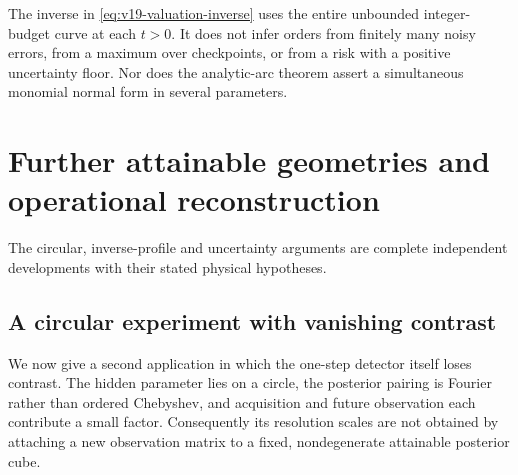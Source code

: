 \documentclass[11pt]{amsart}
\theoremstyle{definition}\newtheorem{definition}[theorem]{Definition}
\theoremstyle{remark}\newtheorem{remark}[theorem]{Remark}
\begin{document}
The inverse in \eqref{eq:v19-valuation-inverse} uses the entire
unbounded integer-budget curve at each $t>0$. It does not infer
orders from finitely many noisy errors, from a maximum over
checkpoints, or from a risk with a positive uncertainty floor.
Nor does the analytic-arc theorem assert a simultaneous monomial
normal form in several parameters.

\endgroup
\section{Further attainable geometries and operational reconstruction}
\label{app:additional-geometry}
The circular, inverse-profile and uncertainty arguments are complete
independent developments with their stated physical hypotheses.
\begingroup
\let\section\subsection
\let\subsection\subsubsection
\let\subsubsection\paragraph
\section{A circular experiment with vanishing contrast}
\label{sec:circular}
We now give a second application in which the one-step detector itself
loses contrast. The hidden parameter lies on a circle, the posterior
pairing is Fourier rather than ordered Chebyshev, and acquisition and
future observation each contribute a small factor. Consequently its
resolution scales are not obtained by attaching a new observation
matrix to a fixed, nondegenerate attainable posterior cube.
\end{document}
